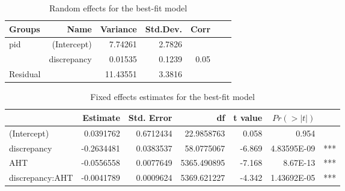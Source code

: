 \begin{table}[H]
    \centering

    \begin{tabular}{lrrrrrr}
        \hline
        Groups & Name & Variance & Std.Dev. & Corr \\ \hline
        pid & (Intercept) & 7.74261 & 2.7826 & ~ \\ 
        ~ & discrepancy & 0.01535 & 0.1239 & 0.05 \\ 
        Residual & ~ & 11.43551 & 3.3816 \\ \hline
    \end{tabular}
    \label{table:lme-bestfit-randomeffects}
    \caption{Random effects for the best-fit model}
\end{table}


\begin{table}[H]
    \centering

    \begin{tabular}{lrrrrrr}
        \hline
        & Estimate & Std. Error & df & t value &  $Pr(>|t|)$     & ~ \\ \hline
        (Intercept) & 0.0391762 & 0.6712434 & 22.9858763 & 0.058 & 0.954 & ~ \\ 
        discrepancy & -0.2634481 & 0.0383537 & 58.0775067 & -6.869 & 4.83595E-09 &  *** \\ 
        AHT & -0.0556558 & 0.0077649 & 5365.490895 & -7.168 & 8.67E-13 &  *** \\ 
        discrepancy:AHT & -0.0041789 & 0.0009624 & 5369.621227 & -4.342 & 1.43692E-05 &  *** \\ \hline
    \end{tabular}
    \label{table:lme-bestfit-fixedeffect}
    \caption{Fixed effects estimates for the best-fit model}
\end{table}
